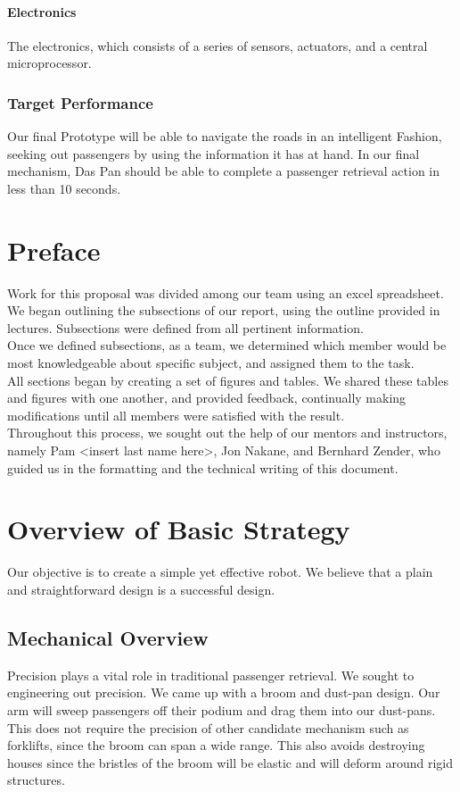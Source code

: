 \documentclass[12pt]{article}
\begin{document}
\paragraph{Electronics}The electronics, which consists of a series of sensors, actuators, and a central microprocessor.  

\subsubsection{Target Performance}
Our final Prototype will be able to navigate the roads in an intelligent
Fashion, seeking out passengers by using the information it has at hand. In our
final mechanism, Das Pan should be able to complete a passenger retrieval action
in less than 10 seconds. 

\section{Preface}
\par Work for this proposal was divided among our team using an excel
spreadsheet. We began outlining the subsections of our report, using the outline
provided in lectures. Subsections were defined from all pertinent information.\\

Once we defined subsections, as a team, we determined which member would be
most knowledgeable about specific subject, and assigned them to the task.\\

All sections began by creating a set of figures and tables. We shared these
tables and figures with one another, and provided feedback, continually making
modifications until all members were satisfied with the result.\\

Throughout this process, we sought out the help of our mentors and instructors,
namely Pam <insert last name here>, Jon Nakane, and Bernhard Zender, who guided
us in the formatting and the technical writing of this document. 

\section{Overview of Basic Strategy}
\par Our objective is to create a simple yet effective robot. We believe that a
plain and straightforward design is a successful design.
\subsection{Mechanical Overview}
\par Precision plays a vital role in traditional passenger retrieval. We sought
to engineering out precision.  We came up with a broom and dust-pan design.  Our
arm will sweep passengers off their podium and drag them into our dust-pans. 
This does not require the precision of other candidate mechanism such as
forklifts, since the broom can span a wide range. This also avoids destroying
houses since the bristles of the broom will be elastic and will deform around
rigid structures. 
\end{document}
